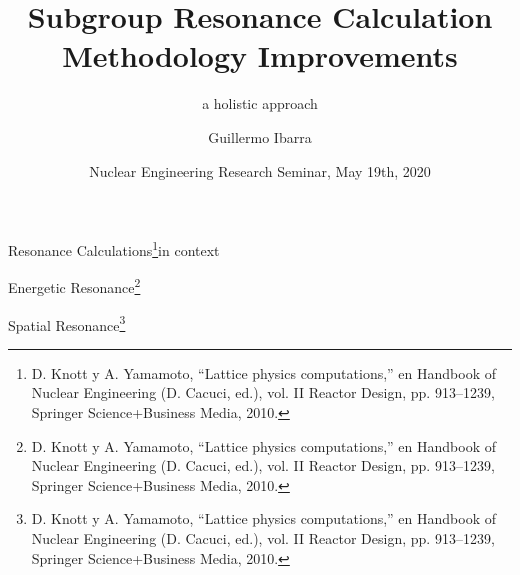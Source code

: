 \documentclass[sans,mathserif,aspectratio=169, 10pt]{beamer}
\title{Subgroup Resonance Calculation Methodology Improvements}
\subtitle{a holistic approach}
\author[Guillermo Ibarra]{Guillermo Ibarra}
\date{Nuclear Engineering Research Seminar, May 19th, 2020}
\begin{document}
\begin{frame}
\titlepage
\end{frame}

\begin{frame}{Resonance Calculations\footnote[frame,1]{D. Knott y A. Yamamoto, “Lattice physics computations,” en Handbook of Nuclear Engineering (D. Cacuci,
ed.), vol. II Reactor Design, pp. 913–1239, Springer Science+Business Media, 2010.}}{in context}
\centering
{}
\end{frame}

\begin{frame}{Energetic Resonance\footnote[frame,1]{D. Knott y A. Yamamoto, “Lattice physics computations,” en Handbook of Nuclear Engineering (D. Cacuci,
ed.), vol. II Reactor Design, pp. 913–1239, Springer Science+Business Media, 2010.}}
\centering
{}
\end{frame}

\begin{frame}{Spatial Resonance\footnote[frame,1]{D. Knott y A. Yamamoto, “Lattice physics computations,” en Handbook of Nuclear Engineering (D. Cacuci,
ed.), vol. II Reactor Design, pp. 913–1239, Springer Science+Business Media, 2010.}}
\centering
{}
\end{frame}
\end{document}
